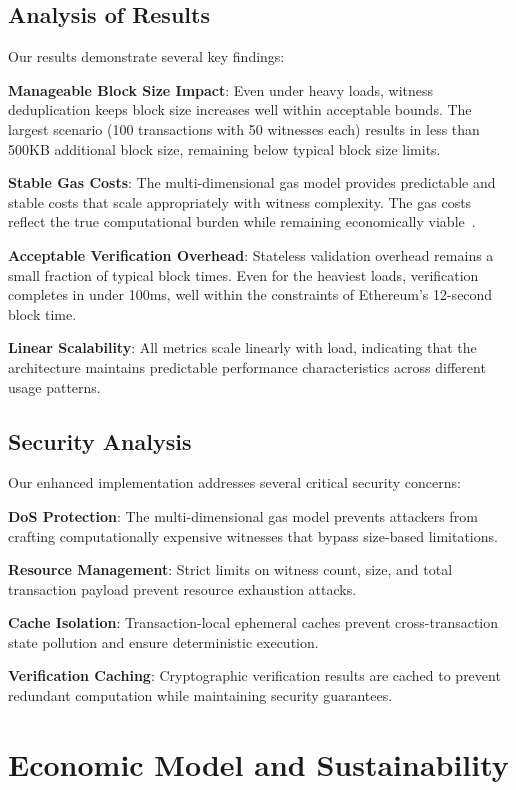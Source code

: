 \documentclass{article}
\begin{document}
\subsection{Analysis of Results}

Our results demonstrate several key findings:

\textbf{Manageable Block Size Impact}: Even under heavy loads, witness deduplication keeps block size increases well within acceptable bounds. The largest scenario (100 transactions with 50 witnesses each) results in less than 500KB additional block size, remaining below typical block size limits.

\textbf{Stable Gas Costs}: The multi-dimensional gas model provides predictable and stable costs that scale appropriately with witness complexity. The gas costs reflect the true computational burden while remaining economically viable~\cite{chen2019gas}.

\textbf{Acceptable Verification Overhead}: Stateless validation overhead remains a small fraction of typical block times. Even for the heaviest loads, verification completes in under 100ms, well within the constraints of Ethereum's 12-second block time.

\textbf{Linear Scalability}: All metrics scale linearly with load, indicating that the architecture maintains predictable performance characteristics across different usage patterns.

\subsection{Security Analysis}

Our enhanced implementation addresses several critical security concerns:

\textbf{DoS Protection}: The multi-dimensional gas model prevents attackers from crafting computationally expensive witnesses that bypass size-based limitations.

\textbf{Resource Management}: Strict limits on witness count, size, and total transaction payload prevent resource exhaustion attacks.

\textbf{Cache Isolation}: Transaction-local ephemeral caches prevent cross-transaction state pollution and ensure deterministic execution.

\textbf{Verification Caching}: Cryptographic verification results are cached to prevent redundant computation while maintaining security guarantees.

\section{Economic Model and Sustainability}
\end{document}
